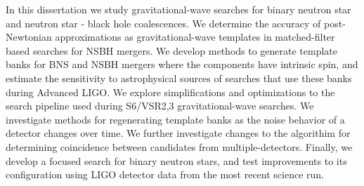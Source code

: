 
In this dissertation we study gravitational-wave searches for 
binary neutron star and neutron star - black hole coalescences. 
We determine the accuracy of post-Newtonian approximations as gravitational-wave
templates in matched-filter based searches for NSBH mergers.
We develop methods to generate template banks for BNS and NSBH mergers where
the components have intrinsic spin, and estimate the sensitivity to
astrophysical sources of searches that use these banks during Advanced LIGO.
We explore simplifications and optimizations to the search pipeline used 
during S6/VSR2,3 gravitational-wave searches. We investigate methods for regenerating
template banks as the noise behavior of a detector changes over time. We further
investigate changes to the algorithim for determining coincidence between
candidates from multiple-detectors.
Finally, we develop a focused search for binary neutron stars, and test improvements
to its configuration using LIGO detector data from the most recent science
run.
